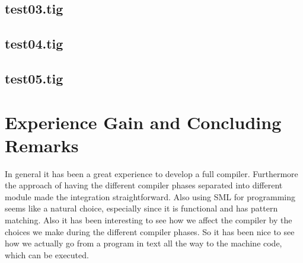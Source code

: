 \documentclass{article}
\begin{document}


\subsection{test03.tig}



\subsection{test04.tig}



\subsection{test05.tig}



\section{Experience Gain and Concluding Remarks}

In general it has been a great experience to develop a full compiler. Furthermore the approach of having the different compiler phases separated into different module made the integration straightforward. Also using SML for programming seems like a natural choice, especially since it is functional and has pattern matching. Also it has been interesting to see how we affect the compiler by the choices we make during the different compiler phases. So it has been nice to see how we actually go from a program in text all the way to the machine code, which can be executed. 
\end{document}
